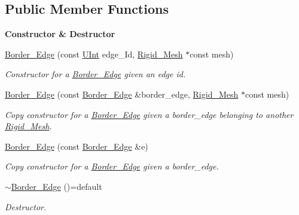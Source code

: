 \subsection*{Public Member Functions}
\begin{Indent}{\bf Constructor \& Destructor}\par
\begin{DoxyCompactItemize}
\item 
\hyperlink{classFVCode3D_1_1Rigid__Mesh_1_1Border__Edge_a610aa0369df57087614115aa44bafc25}{Border\+\_\+\+Edge} (const \hyperlink{namespaceFVCode3D_a4bf7e328c75d0fd504050d040ebe9eda}{U\+Int} edge\+\_\+\+Id, \hyperlink{classFVCode3D_1_1Rigid__Mesh}{Rigid\+\_\+\+Mesh} $\ast$const mesh)
\begin{DoxyCompactList}\small\item\em Constructor for a \hyperlink{classFVCode3D_1_1Rigid__Mesh_1_1Border__Edge}{Border\+\_\+\+Edge} given an edge id. \end{DoxyCompactList}\item 
\hyperlink{classFVCode3D_1_1Rigid__Mesh_1_1Border__Edge_a4c84ed48d5ade111d258cad7e6a32d79}{Border\+\_\+\+Edge} (const \hyperlink{classFVCode3D_1_1Rigid__Mesh_1_1Border__Edge}{Border\+\_\+\+Edge} \&border\+\_\+edge, \hyperlink{classFVCode3D_1_1Rigid__Mesh}{Rigid\+\_\+\+Mesh} $\ast$const mesh)
\begin{DoxyCompactList}\small\item\em Copy constructor for a \hyperlink{classFVCode3D_1_1Rigid__Mesh_1_1Border__Edge}{Border\+\_\+\+Edge} given a border\+\_\+edge belonging to another \hyperlink{classFVCode3D_1_1Rigid__Mesh}{Rigid\+\_\+\+Mesh}. \end{DoxyCompactList}\item 
\hyperlink{classFVCode3D_1_1Rigid__Mesh_1_1Border__Edge_a109336ed2689561dc49808d0e102b5ec}{Border\+\_\+\+Edge} (const \hyperlink{classFVCode3D_1_1Rigid__Mesh_1_1Border__Edge}{Border\+\_\+\+Edge} \&e)
\begin{DoxyCompactList}\small\item\em Copy constructor for a \hyperlink{classFVCode3D_1_1Rigid__Mesh_1_1Border__Edge}{Border\+\_\+\+Edge} given a border\+\_\+edge. \end{DoxyCompactList}\item 
\hyperlink{classFVCode3D_1_1Rigid__Mesh_1_1Border__Edge_a932e4739138fd4e1d53f8ff7ba6d8e02}{$\sim$\+Border\+\_\+\+Edge} ()=default
\begin{DoxyCompactList}\small\item\em Destructor. \end{DoxyCompactList}\end{DoxyCompactItemize}
\end{Indent}

